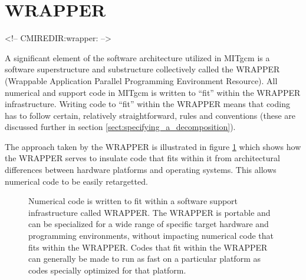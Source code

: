 \section{WRAPPER}
\begin{rawhtml}
<!-- CMIREDIR:wrapper: -->
\end{rawhtml}

A significant element of the software architecture utilized in MITgcm
is a software superstructure and substructure collectively called the
WRAPPER (Wrappable Application Parallel Programming Environment
Resource). All numerical and support code in MITgcm is written to
``fit'' within the WRAPPER infrastructure. Writing code to ``fit''
within the WRAPPER means that coding has to follow certain, relatively
straightforward, rules and conventions (these are discussed further in
section \ref{sect:specifying_a_decomposition}).

The approach taken by the WRAPPER is illustrated in figure
\ref{fig:fit_in_wrapper} which shows how the WRAPPER serves to
insulate code that fits within it from architectural differences
between hardware platforms and operating systems. This allows
numerical code to be easily retargetted.


\begin{figure}
\begin{center}
\end{center}
\caption{
Numerical code is written to fit within a software support
infrastructure called WRAPPER. The WRAPPER is portable and
can be specialized for a wide range of specific target hardware and 
programming environments, without impacting numerical code that fits
within the WRAPPER. Codes that fit within the WRAPPER can generally be
made to run as fast on a particular platform as codes specially 
optimized for that platform.}
\label{fig:fit_in_wrapper}
\end{figure}


